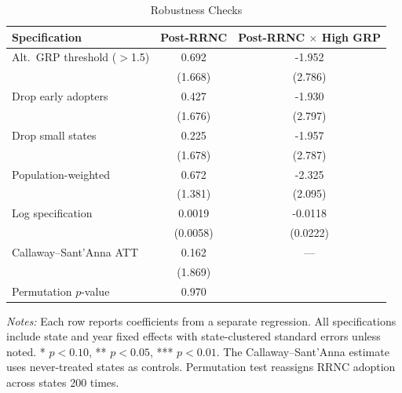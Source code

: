 \begin{table}[H]
\centering
\caption{Robustness Checks}
\begin{threeparttable}
\begin{tabular}{lcc}
\toprule
Specification & Post-RRNC & Post-RRNC $\times$ High GRP \\
\midrule
Alt.~GRP threshold ($>$1.5) & 0.692 & -1.952 \\
 & (1.668) & (2.786) \\
Drop early adopters & 0.427 & -1.930 \\
 & (1.676) & (2.797) \\
Drop small states & 0.225 & -1.957 \\
 & (1.678) & (2.787) \\
Population-weighted & 0.672 & -2.325 \\
 & (1.381) & (2.095) \\
Log specification & 0.0019 & -0.0118 \\
 & (0.0058) & (0.0222) \\
Callaway--Sant'Anna ATT & 0.162 & --- \\
 & (1.869) & \\
Permutation $p$-value & 0.970 & \\
\bottomrule
\end{tabular}
\begin{tablenotes}[flushleft]
\small
\item \textit{Notes:} Each row reports coefficients from a separate regression. All specifications include state and year fixed effects with state-clustered standard errors unless noted. * $p<0.10$, ** $p<0.05$, *** $p<0.01$. The Callaway--Sant'Anna estimate uses never-treated states as controls. Permutation test reassigns RRNC adoption across states 200 times.
\end{tablenotes}
\end{threeparttable}
\label{tab:robustness}
\end{table}
